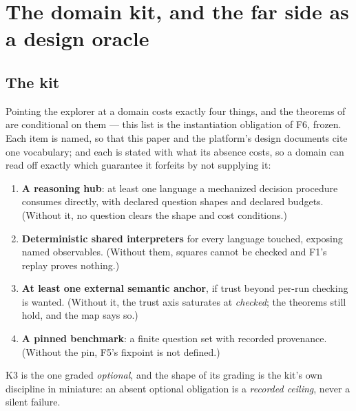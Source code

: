 
\section{The domain kit, and the far side as a design oracle}
\label{sec:kit}

\subsection{The kit}
\label{sec:kit-list}

Pointing the explorer at a domain costs exactly four things, and the
theorems of  are conditional on them — this list is
the instantiation obligation of F6, frozen. Each item is named, so that
this paper and the platform's design documents cite one vocabulary; and
each is stated with what its absence costs, so a domain can read off
exactly which guarantee it forfeits by not supplying it:

\begin{enumerate}
\item[\textbf{K1}] \textbf{A reasoning hub}: at least one language a
  mechanized decision procedure consumes directly, with declared
  question shapes and declared budgets. (Without it, no question clears
  the shape and cost conditions.)
\item[\textbf{K2}] \textbf{Deterministic shared interpreters} for every
  language touched, exposing named observables. (Without them, squares
  cannot be checked and F1's replay proves nothing.)
\item[\textbf{K3}] \textbf{At least one external semantic anchor}, if
  trust beyond per-run checking is wanted. (Without it, the trust axis
  saturates at \textit{checked}; the theorems still hold, and the map
  says so.)
\item[\textbf{K4}] \textbf{A pinned benchmark}: a finite question set
  with recorded provenance. (Without the pin, F5's fixpoint is not
  defined.)
\end{enumerate}

\noindent
K3 is the one graded \emph{optional}, and the shape of its grading is
the kit's own discipline in miniature: an absent optional obligation is
a \emph{recorded ceiling}, never a silent failure.

